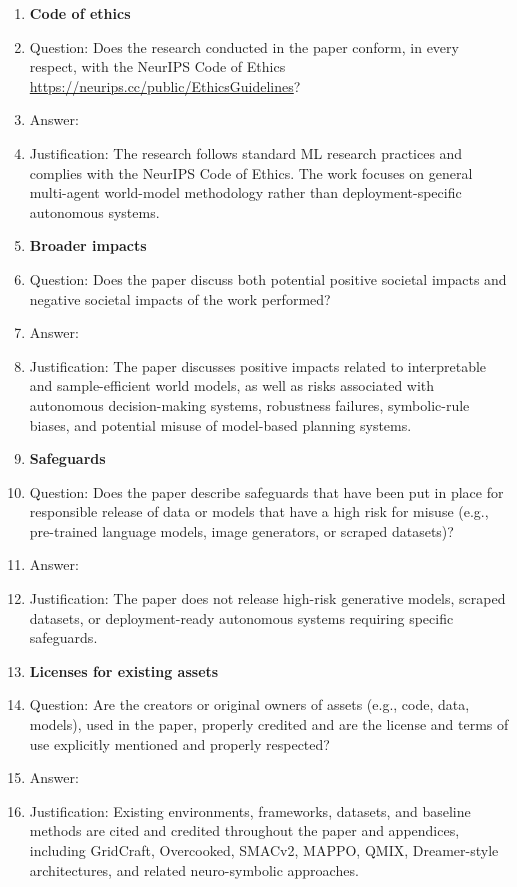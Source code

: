 \begin{enumerate}
      \item {\bf Code of ethics}
      \item[] Question: Does the research conducted in the paper conform, in every respect, with the NeurIPS Code of Ethics \url{https://neurips.cc/public/EthicsGuidelines}?
      \item[] Answer: \answerYes{}
      \item[] Justification: The research follows standard ML research practices and complies with the NeurIPS Code of Ethics. The work focuses on general multi-agent world-model methodology rather than deployment-specific autonomous systems.

      \item {\bf Broader impacts}
      \item[] Question: Does the paper discuss both potential positive societal impacts and negative societal impacts of the work performed?
      \item[] Answer: \answerYes{}
      \item[] Justification: The paper discusses positive impacts related to interpretable and sample-efficient world models, as well as risks associated with autonomous decision-making systems, robustness failures, symbolic-rule biases, and potential misuse of model-based planning systems.

      \item {\bf Safeguards}
      \item[] Question: Does the paper describe safeguards that have been put in place for responsible release of data or models that have a high risk for misuse (e.g., pre-trained language models, image generators, or scraped datasets)?
      \item[] Answer: \answerNA{}
      \item[] Justification: The paper does not release high-risk generative models, scraped datasets, or deployment-ready autonomous systems requiring specific safeguards.

      \item {\bf Licenses for existing assets}
      \item[] Question: Are the creators or original owners of assets (e.g., code, data, models), used in the paper, properly credited and are the license and terms of use explicitly mentioned and properly respected?
      \item[] Answer: \answerYes{}
      \item[] Justification: Existing environments, frameworks, datasets, and baseline methods are cited and credited throughout the paper and appendices, including GridCraft, Overcooked, SMACv2, MAPPO, QMIX, Dreamer-style architectures, and related neuro-symbolic approaches.


\end{enumerate}
